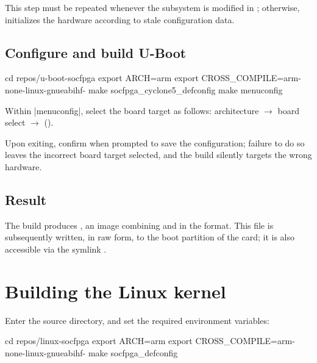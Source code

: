 This step must be repeated whenever the  subsystem is modified in ; otherwise,  initializes the hardware according to stale configuration data.

\subsection{Configure and build U-Boot}

\begin{shellcodehost}
cd repos/u-boot-socfpga
export ARCH=arm
export CROSS_COMPILE=arm-none-linux-gnueabihf-
make socfpga_cyclone5_defconfig
make menuconfig
\end{shellcodehost}

Within |menuconfig|, select the board target as follows:  architecture $\rightarrow$   board select $\rightarrow$   ().

Upon exiting, confirm  when prompted to save the configuration; failure to do so leaves the incorrect board target selected, and the build silently targets the wrong hardware.


\subsection{Result}

The build produces , an image combining  and  in the   format. This file is subsequently written, in raw form, to the boot partition of the  card; it is also accessible via the symlink .

\section{Building the Linux kernel}
\label{sec:fpgalix-kernel}

Enter the  source directory, and set the required environment variables:

\begin{shellcodehost}
cd repos/linux-socfpga
export ARCH=arm
export CROSS_COMPILE=arm-none-linux-gnueabihf-
make socfpga_defconfig
\end{shellcodehost}

